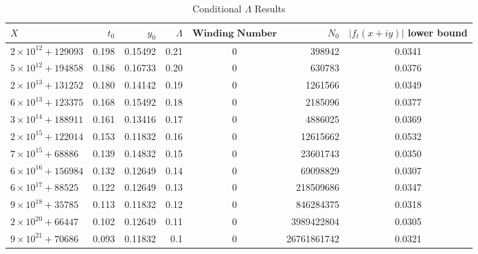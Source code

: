 \begin{table}[ht!]
  \begin{center}
    \caption{Conditional $\Lambda$ Results}
    \label{tab:table1}
    \begin{tabular}{l|r|r|r|c|r|c} %
      $X$ & $t_{0}$ & $y_{0}$ & $\Lambda$ & $\textbf{Winding Number}$ & $N_{0}$ & $|f_t(x+iy)|$ lower bound\\
      \hline
      $2 \times 10^{12} + 129093$ & 0.198 & 0.15492 & 0.21 & 0 & 398942 & 0.0341\\
      $5 \times 10^{12} + 194858$ & 0.186 & 0.16733 & 0.20 & 0 & 630783 & 0.0376\\
      $2 \times 10^{13} + 131252$ & 0.180 & 0.14142 & 0.19 & 0 & 1261566 & 0.0349\\
      $6 \times 10^{13} + 123375$ & 0.168 & 0.15492 & 0.18 & 0 & 2185096 & 0.0377\\
      $3 \times 10^{14} + 188911$ & 0.161 & 0.13416 & 0.17 & 0 & 4886025 & 0.0369\\
      $2 \times 10^{15} + 122014$ & 0.153 & 0.11832 & 0.16 & 0 & 12615662 & 0.0532\\
      $7 \times 10^{15} + 68886$ & 0.139 & 0.14832 & 0.15 & 0 & 23601743 & 0.0350\\
      $6 \times 10^{16} + 156984$ & 0.132 & 0.12649 & 0.14 & 0 & 69098829 & 0.0307\\
      $6 \times 10^{17} + 88525$ & 0.122 & 0.12649 & 0.13 & 0 & 218509686 & 0.0347\\
      $9 \times 10^{18} + 35785$ & 0.113 & 0.11832 & 0.12 & 0 & 846284375 & 0.0318\\
      $2 \times 10^{20} + 66447$ & 0.102 & 0.12649 & 0.11 & 0 & 3989422804 & 0.0305\\
      $9 \times 10^{21} + 70686$ & 0.093 & 0.11832 & 0.1 & 0 & 26761861742 & 0.0321\\
    \end{tabular}
  \end{center}
\end{table}

